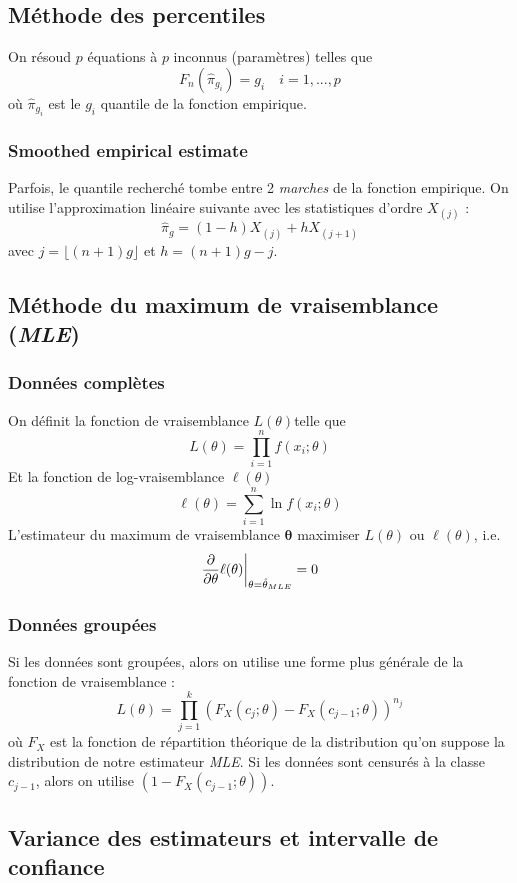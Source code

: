 \documentclass[french, landscape]{article}
\begin{document}
\begin{multicols*}{3}
\subsection*{Méthode des percentiles}
On résoud $p$ équations à $p$ inconnus (paramètres) telles que
\[F_n(\hat{\pi}_{g_i}) = g_i \quad  i = 1, ..., p\]
où $\hat{\pi}_{g_i}$ est le $g_i$ quantile de la fonction empirique.

\subsubsection*{Smoothed empirical estimate}
Parfois, le quantile recherché tombe entre 2 \emph{marches} de la fonction empirique. On utilise l'approximation linéaire suivante avec les statistiques d'ordre $X_{(j)}$ : 
\[\hat{\pi}_{g}  = (1-h)X_{(j)} + h X_{(j+1)} \]
avec $j = \lfloor (n+1)g \rfloor$ et $h = (n+1) g - j$.

\subsection*{Méthode du maximum de vraisemblance (\emph{MLE})}
\subsubsection*{Données complètes}
On définit la fonction de vraisemblance  $L(\theta)$telle que
\[L(\theta) = \prod_{i=1}^{n} f(x_i ; \theta)\]
Et la fonction de log-vraisemblance $\ell(\theta)$
\[\ell(\theta) = \sum_{i=1}^{n}  \ln f(x_i ; \theta) \]
L'estimateur du maximum de vraisemblance $\bm{\theta}$ maximiser $L(\theta)$ ou $\ell(\theta)$, i.e.
\[\frac{\partial}{\partial \theta} \ell(\theta) \biggr \rvert_{\theta = \hat{\theta}_{MLE}}  = 0\]

\subsubsection*{Données groupées}
Si les données sont groupées, alors on utilise une forme plus générale de la fonction de vraisemblance : 
\[L(\theta) =  \prod_{j=1}^{k}  \left( F_X(c_{j} ; \theta) - F_X(c_{j-1} ; \theta) \right)^{n_j}   \]
où $F_X$ est la fonction de répartition théorique de la distribution qu'on suppose la distribution de notre estimateur \emph{MLE}. Si les données sont censurés à la classe $c_{j-1}$, alors on utilise $(1-F_X(c_{j-1}; \theta))$.

\subsection*{Variance des estimateurs et intervalle de confiance}




\end{multicols*}
\end{document}
